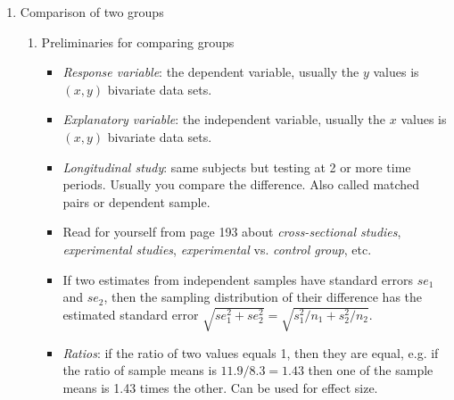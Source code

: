\begin{enumerate}[label=\textbf{\S~\arabic*}, ref=\S~\arabic*]
    \item Comparison of two groups
    \begin{enumerate}[label=\textbf{\S~7.\arabic*}, ref=\S~7.\arabic*]
        \item Preliminaries for comparing groups
        \begin{itemize}
            \item \textit{Response variable}: the dependent variable, usually the $y$ values is $(x,y)$ bivariate data sets. 
            \item \textit{Explanatory variable}: the independent variable, usually the $x$ values is $(x,y)$ bivariate data sets. 
            \item \textit{Longitudinal study}: same subjects but testing at 2 or more time periods. Usually you compare the difference. Also called matched pairs or dependent sample. 
            \item Read for yourself from page 193 about \textit{cross-sectional studies}, \textit{experimental studies}, \textit{experimental} vs. \textit{control group}, etc.
            \item If two estimates from independent samples have standard errors $se_1$ and $se_2$, then the sampling distribution of their difference has the estimated standard error $\sqrt{se_1^2 + se_2^2} = \sqrt{s_1^2/n_1 + s_2^2/n_2}$.
            \item \textit{Ratios}: if the ratio of two values equals 1, then they are equal, e.g. if the ratio of sample means is $11.9/8.3=1.43$ then one of the sample means is 1.43 times the other. Can be used for effect size.
        \end{itemize}
        

\end{enumerate}
\end{enumerate}

